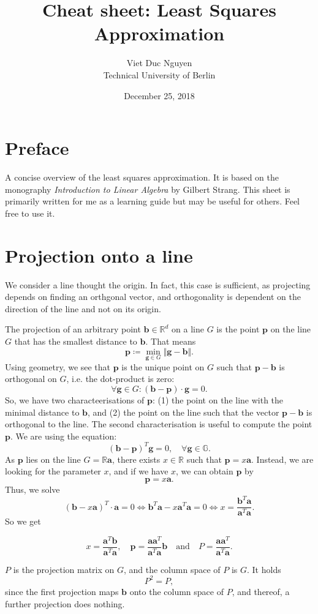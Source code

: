 \documentclass[a4paper, 11pt]{article}
\theoremstyle{plain}
\theoremstyle{definition}
\begin{document}
\title{Cheat sheet: Least Squares Approximation}
\author{Viet Duc Nguyen\\ Technical University of Berlin}
\date{December 25, 2018}
\maketitle
\tableofcontents

\setcounter{section}{-1}
\section{Preface}
A concise overview of the least squares approximation. It is based on the monography \textit{Introduction to Linear Algebra} by Gilbert Strang. This sheet is primarily written for me as a learning guide but may be useful for others. Feel free to use it.

\section{Projection onto a line}
We consider a line thought the origin. In fact, this case is sufficient, as projecting depends on finding an orthgonal vector, and orthogonality is dependent on the direction of the line and not on its origin.

The projection of an arbitrary point $\mathbf b \in \mathbb R^d$ on a line $G$ is the point $\mathbf p$ on the line $G$ that has the smallest distance to $\mathbf b$. That means
\[
	 \mathbf p \coloneqq \min_{\mathbf g \in G} \Vert \mathbf g -\mathbf  b \Vert. 
\]
Using geometry, we see that $\mathbf p$ is the unique point on $G$ such that $\mathbf p - \mathbf b$ is orthogonal on $G$, i.e. the dot-product is zero:
\[
	\forall \mathbf g \in G:  (\mathbf b - \mathbf p) \cdot \mathbf g = 0.
\]
So, we have two characteerisations of $\mathbf p$: (1) the point on the line with the minimal distance to $\mathbf b$, and (2) the point on the line such that the vector $\mathbf p - \mathbf b$ is orthogonal to the line. The second characterisation is useful to compute the point $\mathbf p$. We are using the equation:
\[
	(\mathbf b - \mathbf p)^T \mathbf g = 0, \quad \forall \mathbf g \in \mathbb G.
\]
As $\mathbf p$ lies on the line $G = \mathbb R \mathbf a$, there exists $x \in \mathbb R$ such that $\mathbf p = x \mathbf a$. Instead, we are looking for the parameter $x$, and if we have $x$, we can obtain $\mathbf p$ by $$\mathbf p = x \mathbf a.$$
Thus, we solve
\[
	( \mathbf b - x\mathbf a)^T \cdot \mathbf a  = 0 \iff \mathbf{b}^T\mathbf{a} - x\mathbf{a}^T\mathbf{a} = 0 \iff x = \frac{\mathbf b^T \mathbf a}{\mathbf a^T \mathbf a}.
\]
So we get
\begin{framed}
\[
	x = \frac{\mathbf a^T \mathbf b}{\mathbf a^T \mathbf a}, \quad \mathbf p = \frac{\mathbf a \mathbf a^T}{\mathbf a^T \mathbf a}\mathbf b \quad \text{and} \quad  P = \frac{\mathbf a \mathbf a^T}{\mathbf a^T \mathbf a}.
\]
\end{framed}
$ P$ is the projection matrix on $G$, and the column space of $ P$ is $G$. It holds
\[
	 P^2 =  P,
\]
since the first projection maps $\mathbf b$ onto the column space of $ P$, and thereof, a further projection does nothing. 
\end{document}
